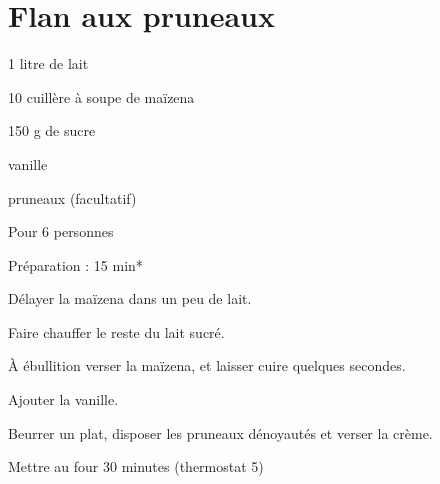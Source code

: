 \section{Flan aux pruneaux}

\begin{ingredients}
\item 1 litre de lait
\item 10 cuillère à soupe de maïzena
\item 150 g de sucre
\item vanille
\item pruneaux (facultatif)
\end{ingredients}
\begin{infos}
\item Pour 6 personnes		%
\item Préparation : 15 min*		%
\end{infos}
\begin{etapes}
\item Délayer la maïzena dans un peu de lait.
\item Faire chauffer le reste du lait sucré.
\item À ébullition verser la maïzena, et laisser cuire quelques secondes.
\item Ajouter la vanille.
\item Beurrer un plat, disposer les pruneaux dénoyautés et verser la crème.
\item Mettre au four 30 minutes (thermostat 5)
\end{etapes}
\begin{conseils}
\end{conseils}
